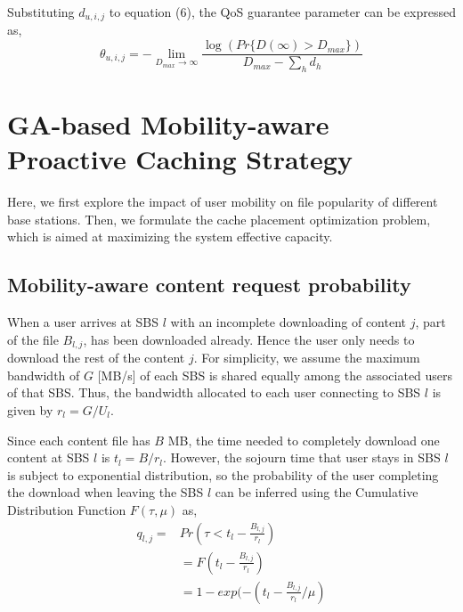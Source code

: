 \documentclass[conference]{IEEEtran}
\begin{document}
Substituting $d_{u,i,j}$ to equation (6), the QoS guarantee parameter can be expressed as,
\begin{equation}
\theta_{u,i,j}=-\lim_{D_{max}\to \infty}\frac{\log(Pr\{D(\infty)>D_{max}\})}{D_{max}-\sum_h d_h}
\end{equation}

\section{GA-based Mobility-aware Proactive Caching Strategy}
Here, we first explore the impact of user mobility on file popularity of different base stations. Then, we formulate the cache placement optimization problem, which is aimed at maximizing the system effective capacity.
\subsection{Mobility-aware content request probability}
When a user arrives at SBS $l$ with an incomplete downloading of content $j$, part of the file $B_{l,j}$, has been downloaded already. Hence the user only needs to download the rest of the content $j$. For simplicity, we assume the maximum bandwidth of $G$ [MB/s] of each SBS is shared equally among the associated users of that SBS\cite{8108779}. Thus, the bandwidth allocated to each user connecting to SBS $l$ is given by $r_l=G/U_l$.

Since each content file has $B$ MB, the time needed to completely download one content at SBS $l$ is $t_l=B/r_l$.
However, the sojourn time that user stays in SBS $l$ is subject to exponential distribution, so the probability of the user completing the download when leaving the SBS $l$ can be inferred using the Cumulative Distribution Function $F(\tau,\mu)$ as,
\begin{equation}
  \begin{aligned}
 q_{l,j}=& Pr(\tau<t_l-\frac{B_{l,j}}{r_l})\\
  &=F(t_l-\frac{B_{l,j}}{r_l})\\
  &=1-exp(-(t_l-\frac{B_{l,j}}{r_l}/\mu)
  \end{aligned}
\end{equation}
\end{document}
